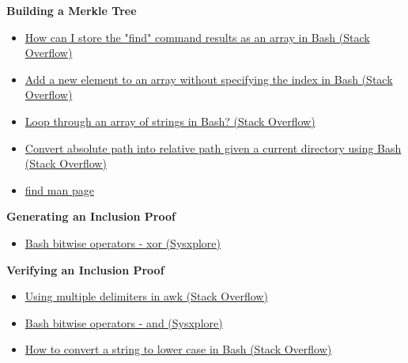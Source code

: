 \documentclass[12pt]{article}
\newenvironment{problem}[2][Problem]{\begin{trivlist}
\item[\hskip \labelsep {\bfseries #1}\hskip \labelsep {\bfseries #2}]}{\end{trivlist}}
\begin{document}
\begin{problem}{2.} \textbf{Building a Merkle Tree}
  \begin{itemize}
    \item \href{https://stackoverflow.com/questions/23356779/how-can-i-store-the-find-command-results-as-an-array-in-bash/54561526#54561526/}{How can I store the "find" command results as an array in Bash (Stack Overflow)}
    \item \href{https://stackoverflow.com/questions/1951506/add-a-new-element-to-an-array-without-specifying-the-index-in-bash}{Add a new element to an array without specifying the index in Bash (Stack Overflow)}
    \item \href{https://stackoverflow.com/questions/8880603/loop-through-an-array-of-strings-in-bash}{Loop through an array of strings in Bash? (Stack Overflow)}
    \item \href{https://stackoverflow.com/questions/2564634/convert-absolute-path-into-relative-path-given-a-current-directory-using-bash}{Convert absolute path into relative path given a current directory using Bash (Stack Overflow)}
    \item \href{https://man.archlinux.org/man/find.1.zh_TW#type}{find man page}
  \end{itemize}
\end{problem}
\begin{problem}{3.} \textbf{Generating an Inclusion Proof}
  \begin{itemize}
    \item \href{https://sysxplore.com/bash-bitwise-operators/#bitwise-xor}{Bash bitwise operators - xor (Sysxplore)}
  \end{itemize}
\end{problem}
\begin{problem}{4.} \textbf{Verifying an Inclusion Proof}
  \begin{itemize}
    \item \href{https://stackoverflow.com/questions/12204192/using-multiple-delimiters-in-awk}{Using multiple delimiters in awk (Stack Overflow)}
    \item \href{https://sysxplore.com/bash-bitwise-operators/#bitwise-and}{Bash bitwise operators - and (Sysxplore)}
    \item \href{https://stackoverflow.com/questions/2264428/how-to-convert-a-string-to-lower-case-in-bash}{How to convert a string to lower case in Bash (Stack Overflow)}
  \end{itemize}
\end{problem}
\end{document}
